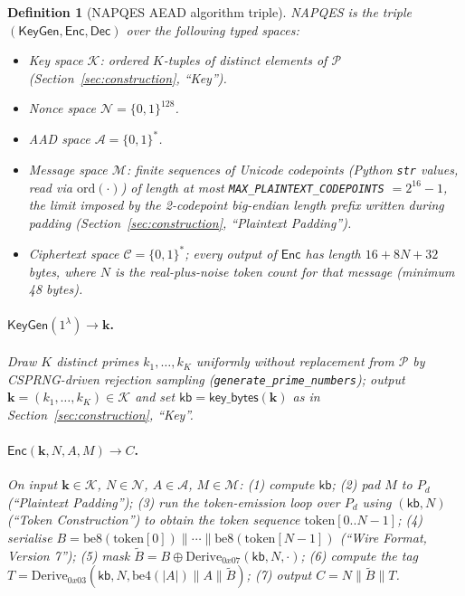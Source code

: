 \documentclass[11pt,a4paper]{article}
\newtheorem{definition}[theorem]{Definition}
\begin{document}
\begin{definition}[NAPQES AEAD algorithm triple]\label{def:aead-triple}
NAPQES is the triple $(\mathsf{KeyGen}, \mathsf{Enc}, \mathsf{Dec})$ over the
following typed spaces:
\begin{itemize}
  \item Key space $\mathcal{K}$: ordered $K$-tuples of distinct elements of
        $\mathcal{P}$ (Section~\ref{sec:construction}, ``Key'').
  \item Nonce space $\mathcal{N} = \{0,1\}^{128}$.
  \item AAD space $\mathcal{A} = \{0,1\}^{*}$.
  \item Message space $\mathcal{M}$: finite sequences of Unicode codepoints
        (Python \texttt{str} values, read via $\mathrm{ord}(\cdot)$) of length
        at most \texttt{MAX\_PLAINTEXT\_CODEPOINTS} $= 2^{16}-1$, the limit
        imposed by the 2-codepoint big-endian length prefix written during
        padding (Section~\ref{sec:construction}, ``Plaintext Padding'').
  \item Ciphertext space $\mathcal{C} = \{0,1\}^{*}$; every output of
        $\mathsf{Enc}$ has length $16 + 8N + 32$ bytes, where $N$ is the
        real-plus-noise token count for that message (minimum 48 bytes).
\end{itemize}

\paragraph{$\mathsf{KeyGen}(1^{\lambda}) \to \mathbf{k}$.}
Draw $K$ distinct primes $k_1,\ldots,k_K$ uniformly without replacement from
$\mathcal{P}$ by CSPRNG-driven rejection sampling
(\texttt{generate\_prime\_numbers}); output
$\mathbf{k} = (k_1,\ldots,k_K) \in \mathcal{K}$ and set
$\mathsf{kb} = \mathsf{key\_bytes}(\mathbf{k})$ as in
Section~\ref{sec:construction}, ``Key''.

\paragraph{$\mathsf{Enc}(\mathbf{k}, N, A, M) \to C$.}
On input $\mathbf{k}\in\mathcal{K}$, $N\in\mathcal{N}$, $A\in\mathcal{A}$,
$M\in\mathcal{M}$: (1) compute $\mathsf{kb}$; (2) pad $M$ to $P_d$
(``Plaintext Padding''); (3) run the token-emission loop over $P_d$ using
$(\mathsf{kb}, N)$ (``Token Construction'') to obtain the token sequence
$\mathrm{token}[0..N{-}1]$; (4) serialise
$B = \mathrm{be8}(\mathrm{token}[0])\|\cdots\|\mathrm{be8}(\mathrm{token}[N{-}1])$
(``Wire Format, Version 7''); (5) mask
$\widetilde{B} = B \oplus \mathrm{Derive}_{0x07}(\mathsf{kb}, N, \cdot)$;
(6) compute the tag
$T = \mathrm{Derive}_{0x03}(\mathsf{kb}, N, \mathrm{be4}(|A|)\|A\|\widetilde{B})$;
(7) output $C = N \| \widetilde{B} \| T$.


\end{definition}
\end{document}
